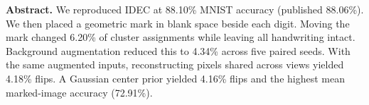 \textbf{Abstract.} We reproduced IDEC at 88.10\% MNIST accuracy (published 88.06\%). We then placed a geometric mark in blank space beside each digit. Moving the mark changed 6.20\% of cluster assignments while leaving all handwriting intact. Background augmentation reduced this to 4.34\% across five paired seeds. With the same augmented inputs, reconstructing pixels shared across views yielded 4.18\% flips. A Gaussian center prior yielded 4.16\% flips and the highest mean marked-image accuracy (72.91\%).
